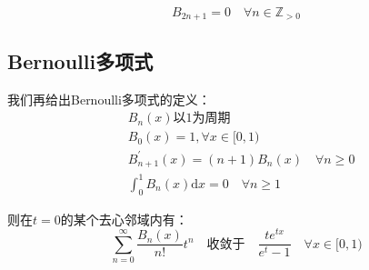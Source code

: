 \documentclass[a4paper,12pt]{ctexart}
\theoremstyle{definition}
\begin{document}
$$B_{2n+1}=0 \quad \forall n\in \mathbb{Z}_{>0} $$

\subsection{Bernoulli多项式}
我们再给出Bernoulli多项式的定义：
\begin{align*}
     & B_n(x)\text{以1为周期}                               \\
     & B_0(x)=1,\forall x \in [0,1)\quad                    \\
     & B^{\prime}_{n+1}(x)=(n+1)B_n(x) \quad \forall n\ge 0 \\
     & \int_0^1  B_n(x)\text{d}x =0\quad  \forall n\ge 1
\end{align*}

则在$t=0$的某个去心邻域内有：
\begin{equation}
    \sum_{n=0}^{\infty}\frac{B_n(x)}{n!}t^n\quad \text{收敛于} \quad \frac{te^{tx}}{e^t-1}\quad \forall x\in[0,1)
\end{equation}
\end{document}
